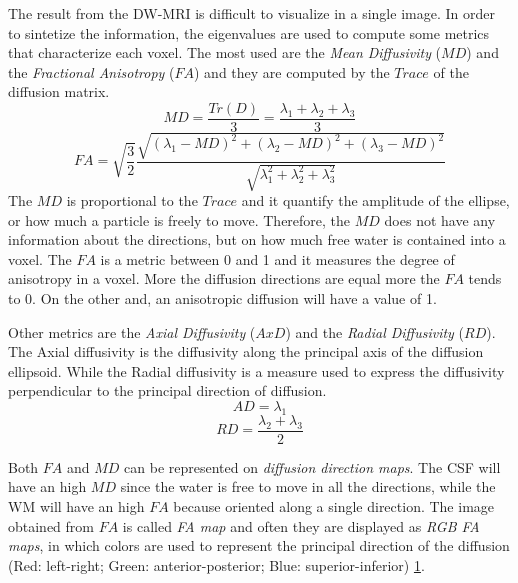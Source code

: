  The result from the DW-MRI is difficult to visualize in a single image. In order to sintetize the information, the eigenvalues are used to compute some metrics that characterize each voxel. The most used are the \emph{Mean Diffusivity} ($MD$) and the \emph{Fractional Anisotropy} ($FA$) and they are computed by the $Trace$ of the diffusion matrix.
 \begin{equation}
    {MD} = \frac{{Tr}(D)}{3} = \frac{\lambda_1 + \lambda_2 + \lambda_3}{3}
 \end{equation}
 \begin{equation}
    FA = \sqrt{\frac{3}{2}}\frac{\sqrt{(\lambda_1-MD)^2+(\lambda_2-MD)^2+(\lambda_3-MD)^2}}{\sqrt{\lambda_1^2+\lambda_2^2+\lambda_3^2}}
 \end{equation}
 The $MD$ is proportional to the $Trace$ and it quantify the amplitude of the ellipse, or how much a particle is freely to move. Therefore, the $MD$ does not have any information about the directions, but on how much free water is contained into a voxel. The $FA$ is a metric between 0 and 1 and it measures the degree of anisotropy in a voxel. More the diffusion directions are equal more the $FA$ tends to 0. On the other and, an anisotropic diffusion will have a value of 1.
 
 Other metrics are the \emph{Axial Diffusivity} ($AxD$) and the \emph{Radial Diffusivity} ($RD$). The Axial diffusivity is the diffusivity along the principal axis of the diffusion ellipsoid. While the Radial diffusivity is a measure used to express the diffusivity perpendicular to the principal direction of diffusion.
 \begin{equation}
    AD = \lambda_1
 \end{equation}
 \begin{equation}
    RD = \frac{\lambda_2+\lambda_3}{2}
 \end{equation}

 Both $FA$ and $MD$ can be represented on \emph{diffusion direction maps}. The CSF will have an high $MD$ since the water is free to move in all the directions, while the WM will have an high $FA$ because oriented along a single direction. The image obtained from $FA$ is called \emph{FA map} and often they are displayed as \emph{RGB FA maps}, in which colors are used to represent the principal direction of the diffusion (Red: left-right; Green: anterior-posterior; Blue: superior-inferior) \ref{fig:DTImaps}.

  \begin{figure}[h]
    \centering
    \caption{}
    \label{fig:DTImaps}
 \end{figure}

